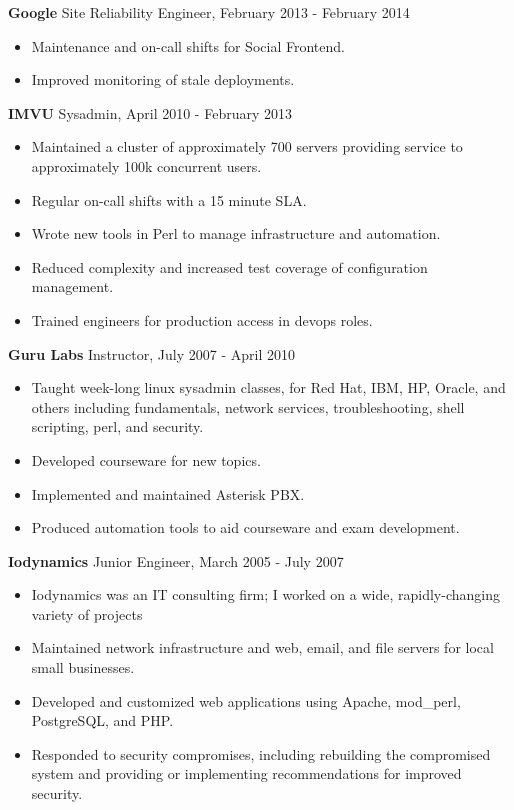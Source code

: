 \documentclass[line]{res}
\begin{document}
\begin{resume}
\textbf{Google} Site Reliability Engineer, February 2013 - February 2014
\begin{itemize}
\item Maintenance and on-call shifts for Social Frontend.
\item Improved monitoring of stale deployments.
\end{itemize}

\textbf{IMVU} Sysadmin, April 2010 - February 2013
\begin{itemize}
\item Maintained a cluster of approximately 700 servers providing service to approximately 100k concurrent users.
\item Regular on-call shifts with a 15 minute SLA.
\item Wrote new tools in Perl to manage infrastructure and automation.
\item Reduced complexity and increased test coverage of configuration management.
\item Trained engineers for production access in devops roles.
\end{itemize}

\textbf{Guru Labs} Instructor, July 2007 - April 2010
\begin{itemize}
\item Taught week-long linux sysadmin classes, for Red Hat, IBM, HP, Oracle, and others including fundamentals, network services, troubleshooting, shell scripting, perl, and security.
\item Developed courseware for new topics.
\item Implemented and maintained Asterisk PBX.
\item Produced automation tools to aid courseware and exam development.
\end{itemize}

\textbf{Iodynamics} Junior Engineer, March 2005 - July 2007
\begin{itemize}
\item Iodynamics was an IT consulting firm; I worked on a wide, rapidly-changing variety of projects
\item Maintained network infrastructure and web, email, and file servers for local small businesses.
\item Developed and customized web applications using Apache, mod\_perl, PostgreSQL, and PHP.
\item Responded to security compromises, including rebuilding the compromised system and providing or implementing recommendations for improved security.
\end{itemize}


\end{resume}
\end{document}
